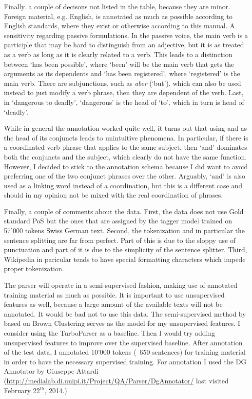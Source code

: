 \documentclass[11pt,letterpaper, covington]{article}
\begin{document}
Finally. a couple of decisons not listed in the table, because they are minor. Foreign material, e.g. English, is annotated as much as possible according to English standards, where they exist or otherwise according to this manual. A sensitivity regarding passive formulations. In the passive voice, the main verb is a participle that may be hard to distinguish from an adjective, but it is as treated as a verb as long as it is clearly related to a verb. This leads to a distinction between `has been possible', where `been' will be the main verb that gets the arguments as its dependents and `has been registered', where 	`registered' is the main verb. There are subjunctions, such as \emph{aber} (`but'), which can also be used instead to just modify a verb phrase, then they are dependent of the verb. Last, in `dangerous to deadly', `dangerous' is the head of `to', which in turn is head of `deadly'. 

While in general the annotation worked quite well, it turns out that using and as the head of its conjuncts leads to unintuitive phenomena. In particular, if there is a coordinated verb phrase that applies to the same subject, then `and' dominates both the conjuncts and the subject, which clearly do not have the same function. However, I decided to stick to the annotation schema because I did want to avoid preferring one of the two conjunct phrases over the other. Arguably, `and' is also used as a linking word instead of a coordination, but this is a different case and should in my opinion not be mixed with the real coordination of phrases. 

Finally, a couple of comments about the data. First, the data does not use Gold standard PoS but the ones that are assigned by the tagger model trained on 57'000 tokens Swiss German text. Second, the tokenization and in particular the sentence splitting are far from perfect. Part of this is due to the sloppy use of punctuation and part of it is due to the simplicity of the sentence splitter. Third, Wikipedia in paricular tends to have special formatting characters which impede proper tokenization. 

The parser will operate in a semi-supervised fashion, making use of annotated training material as much as possible. It is important to use unsupervised features as well, because a large amount of the available texts will not be annotated. It would be bad not to use this data. The semi-supervised method by \citet{KCC08} based on Brown Clustering serves as the model for my unsupervised features.  I consider using the TurboParser \citep{MSXAF10} as a baseline. Then I would try adding unsupervised features to improve over the supervised baseline.
After annotation of the test data, I annotated 10'000 tokens (~650 sentences) for training material in order to have the necessary supervised training. For annotation I used the DG Annotator by Giuseppe Attardi (\url{http://medialab.di.unipi.it/Project/QA/Parser/DgAnnotator/} last visited February 22$^{th}$, 2014.) 
\end{document}
